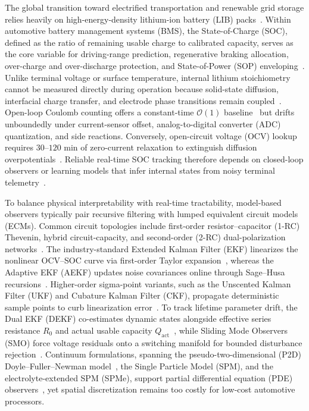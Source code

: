 \documentclass[10pt,a4paper]{article}
\begin{document}
The global transition toward electrified transportation and renewable grid storage relies heavily on high-energy-density lithium-ion battery (LIB) packs~\cite{Tarascon2001,Lu2013review}. Within automotive battery management systems (BMS), the State-of-Charge (SOC), defined as the ratio of remaining usable charge to calibrated capacity, serves as the core variable for driving-range prediction, regenerative braking allocation, over-charge and over-discharge protection, and State-of-Power (SOP) enveloping~\cite{Plett2004part1,Xiong2018joint,Farmann2016peukert}. Unlike terminal voltage or surface temperature, internal lithium stoichiometry cannot be measured directly during operation because solid-state diffusion, interfacial charge transfer, and electrode phase transitions remain coupled~\cite{Doyle1993,Torchio2016pybam}. Open-loop Coulomb counting offers a constant-time $\mathcal{O}(1)$ baseline~\cite{Plett2004part1} but drifts unboundedly under current-sensor offset, analog-to-digital converter (ADC) quantization, and side reactions. Conversely, open-circuit voltage (OCV) lookup requires $30\text{--}120\text{ min}$ of zero-current relaxation to extinguish diffusion overpotentials~\cite{Roscher2011hysteresis,Verbrugge2004hysteresis}. Reliable real-time SOC tracking therefore depends on closed-loop observers or learning models that infer internal states from noisy terminal telemetry~\cite{Plett2004part2,Hu2012ecm,Ren2019aging}.

To balance physical interpretability with real-time tractability, model-based observers typically pair recursive filtering with lumped equivalent circuit models (ECMs). Common circuit topologies include first-order resistor--capacitor (1-RC) Thevenin, hybrid circuit-capacity, and second-order (2-RC) dual-polarization networks~\cite{He2011ecm,Hu2012ecm,Kim2011}. The industry-standard Extended Kalman Filter (EKF) linearizes the nonlinear OCV--SOC curve via first-order Taylor expansion~\cite{Plett2004part3,Santhanagopalan2006jes}, whereas the Adaptive EKF (AEKF) updates noise covariances online through Sage--Husa recursions~\cite{Xiang2022aekf}. Higher-order sigma-point variants, such as the Unscented Kalman Filter (UKF) and Cubature Kalman Filter (CKF), propagate deterministic sample points to curb linearization error~\cite{Plett2006ukf,He2013ukf,Li2021ackf}. To track lifetime parameter drift, the Dual EKF (DEKF) co-estimates dynamic states alongside effective series resistance $R_0$ and actual usable capacity $Q_{\text{act}}$~\cite{Charkhgard2010dekf,Yang2024degradation}, while Sliding Mode Observers (SMO) force voltage residuals onto a switching manifold for bounded disturbance rejection~\cite{Chen2016smo,Huangfu2018smo}. Continuum formulations, spanning the pseudo-two-dimensional (P2D) Doyle--Fuller--Newman model~\cite{Doyle1993,Torchio2016pybam,Northrop2014p2d}, the Single Particle Model (SPM), and the electrolyte-extended SPM (SPMe), support partial differential equation (PDE) observers~\cite{DiDomenico2010spm,Moura2017pde,Marquis2019spme}, yet spatial discretization remains too costly for low-cost automotive processors.
\end{document}

